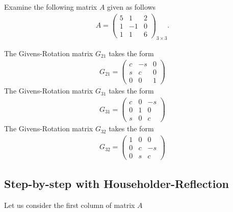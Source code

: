 \documentclass[12pt]{article}
\begin{document}
\clearpage
\begin{exampleboxed}
	Examine the following matrix $A$ given as follows
	\begin{align}
		A = \begin{pmatrix} 5 &1 &2 \\ 1 &-1 &0 \\ 1 &1 &6 \end{pmatrix}_{3\times 3}.
	\end{align}
\end{exampleboxed}
The Givens-Rotation matrix $G_{21}$ takes the form
\begin{align}
	G_{21} = 
	\begin{pmatrix}  c &-s &0 \\ s &c &0 \\ 0 &0 &1 \end{pmatrix}
\end{align}
The Givens-Rotation matrix $G_{31}$ takes the form
\begin{align}
	G_{31} = 
	\begin{pmatrix}  c &0 &-s \\ 0 &1 &0 \\ s &0 &c \end{pmatrix}
\end{align}
The Givens-Rotation matrix $G_{32}$ takes the form
\begin{align}
	G_{32} = 
	\begin{pmatrix}  1 &0 &0 \\ 0 &c &-s \\ 0 &s &c \end{pmatrix}
\end{align}

\clearpage
\subsection{Step-by-step with Householder-Reflection}

Let us consider the first column of matrix $A$

\clearpage
{}
\end{document}
